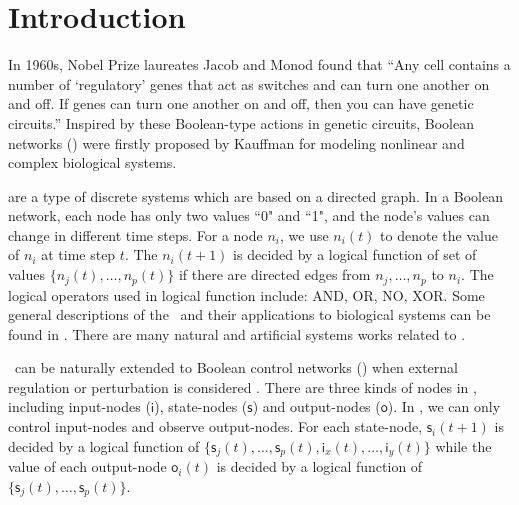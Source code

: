 \section{Introduction}
\label{sec:intro}


In 1960s, Nobel Prize laureates Jacob and Monod found that ``Any cell contains a number of `regulatory' genes that act as switches and can turn one another on and off. If genes can turn one another on and off, then you can have genetic circuits.''\cite{Jacob1961Genetic} Inspired by these Boolean-type actions in genetic circuits, Boolean networks (\BNs) were firstly proposed by Kauffman \cite{Kauffman1968Metabolic} for modeling nonlinear and complex biological systems. 

{\BNs} are a type of discrete systems which are based on a directed graph. In a Boolean network, each node has only two values ``0" and ``1", and
the node's values can change in different time steps.  For a node $n_i$, we use $n_i(t)$ to denote the value of $n_i$ at time step $t$.
%
The $n_i(t+1)$ is decided by a logical function of  set of  values  $\{n_j(t),\ldots,n_p(t)\}$ if  there are directed edges from $n_j,\ldots,n_p$ to $n_i$.  %
 The logical operators used in  logical function include: AND, OR, NO, XOR. %
Some general descriptions of the \BNs\ and their applications to biological systems can be found in \cite{Kauffman1968Metabolic}.
There are many natural and artificial systems works \cite{Akutsu2000Inferring, Shmulevich2002From, Faur2006Dynamical,Green2007The,Lou2010Multi} related to \BNs.
 

\BNs\ can be naturally extended to Boolean control networks (\BCNs) when external regulation or perturbation is considered \cite{Ideker2001A}. There are three kinds of nodes in \BCNs, including input-nodes ($\mathsf{i}$), state-nodes ($\mathsf{s}$) and output-nodes ($\mathsf{o}$). In \BCNs, we can only control input-nodes and observe output-nodes. 
For each state-node, $\mathsf{s}_i(t+1)$ is decided by a logical function of  $\{\mathsf{s}_j(t),\ldots,\mathsf{s}_p(t),\mathsf{i}_x(t),\ldots,\mathsf{i}_y(t)\}$  %
while the value of each output-node $\mathsf{o}_i(t)$ is decided by a logical function of   $\{\mathsf{s}_j(t),\ldots,\mathsf{s}_p(t)\}$. 

